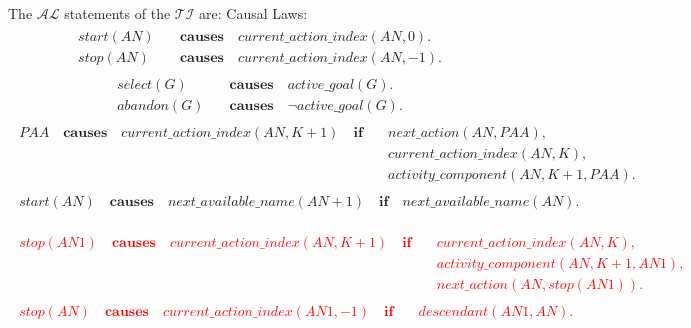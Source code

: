 \documentclass[11pt, oneside]{article}
\begin{document}
The $\mathcal{AL}$ statements of the $\mathcal{TI}$ are:\newline
Causal Laws:
\begin{align}\begin{split}
 start(AN)\quad &\mathbf{causes} \quad current\_action\_index(AN, 0). \\
 stop(AN)\quad &\mathbf{causes} \quad current\_action\_index(AN, -1). 
\end{split}\end{align}
\begin{align}\begin{split}
select(G)\quad &\mathbf{causes} \quad active\_goal(G). \\
abandon(G)\quad &\mathbf{causes} \quad \neg active\_goal(G). 
\end{split}\end{align}
\begin{align}\begin{split}
PAA\quad \mathbf{causes} \quad current\_action\_index(AN, K+1)\quad \mathbf{if}\quad &next\_action(AN, PAA), \\
&current\_action\_index(AN, K),\\
&activity\_component(AN, K+1, PAA).
\end{split}\end{align}
\begin{align}\begin{split}
start(AN) \quad \mathbf{causes} \quad next\_available\_name(AN+1) \quad \mathbf{if}\quad next\_available\_name(AN). 
\end{split}\end{align}

\textcolor{red}{
\begin{align}\begin{split}
stop(AN1) \quad \mathbf{causes} \quad current\_action\_index(AN, K+1) \quad \mathbf{if}\quad &current\_action\_index(AN, K), \\
&activity\_component(AN, K+1, AN1), \\
&next\_action(AN, stop(AN1)). 
\end{split}\end{align}
\begin{align}\begin{split}
stop(AN) \quad \mathbf{causes} \quad current\_action\_index(AN1, -1) \quad \mathbf{if}\quad &descendant(AN1, AN).
\end{split}\end{align}
}
\end{document}
